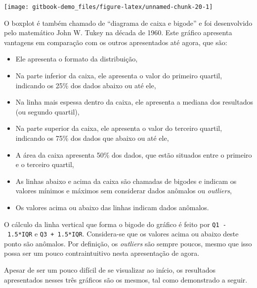 \documentclass[
]{book}
\providecommand{\tightlist}{%
  \setlength{\itemsep}{0pt}\setlength{\parskip}{0pt}}
\begin{document}
\begin{center}\texttt{[image: gitbook-demo\_files/figure-latex/unnamed-chunk-20-1]} \end{center}

O boxplot é também chamado de ``diagrama de caixa e bigode'' e foi desenvolvido pelo matemático John W. Tukey na década de 1960. Este gráfico apresenta vantagens em comparação com os outros apresentados até agora, que são:

\begin{itemize}
\tightlist
\item
  Ele apresenta o formato da distribuição,\\
\item
  Na parte inferior da caixa, ele apresenta o valor do primeiro quartil, indicando os 25\% dos dados abaixo ou até ele,\\
\item
  Na linha mais espessa dentro da caixa, ele apresenta a mediana dos resultados (ou segundo quartil),\\
\item
  Na parte superior da caixa, ele apresenta o valor do terceiro quartil, indicando os 75\% dos dados que abaixo ou até ele,\\
\item
  A área da caixa apresenta 50\% dos dados, que estão situados entre o primeiro e o terceiro quartil,\\
\item
  As linhas abaixo e acima da caixa são chamadas de bigodes e indicam os valores mínimos e máximos sem considerar dados anômalos ou \emph{outliers},\\
\item
  Os valores acima ou abaixo das linhas indicam dados anômalos.
\end{itemize}

O cálculo da linha vertical que forma o bigode do gráfico é feito por \texttt{Q1\ -\ 1.5*IQR} e \texttt{Q3\ +\ 1.5*IQR}. Considera-se que os valores acima ou abaixo deste ponto são anômalos. Por definição, os \emph{outliers} são sempre poucos, mesmo que isso possa ser um pouco contraintuitivo nesta apresentação de agora.

Apesar de ser um pouco difícil de se visualizar ao início, os resultados apresentados nesses três gráficos são os mesmos, tal como demonstrado a seguir.
\end{document}
